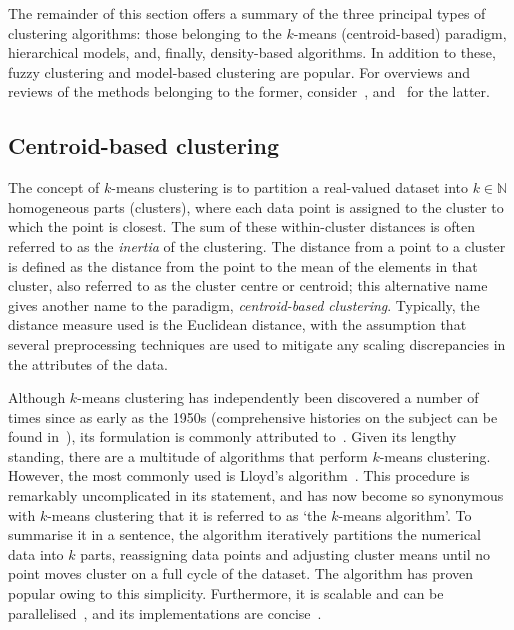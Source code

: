 The remainder of this section offers a summary of the three principal types of
clustering algorithms: those belonging to the \(k\)-means (centroid-based)
paradigm, hierarchical models, and, finally, density-based algorithms. In
addition to these, fuzzy clustering and model-based clustering are popular. For
overviews and reviews of the methods belonging to the former,
consider~\cite{Ferraro2019,Gosain2016,Li2016},
and~\cite{Bouveyron2019,Fruhwirth2019,McNicholas2016} for the latter.

\subsection{Centroid-based clustering}\label{subsec:kmeans}

The concept of \(k\)-means clustering is to partition a
real-valued dataset into \(k \in \mathbb N\) homogeneous parts (clusters), where
each data point is assigned to the cluster to which the point is closest. The
sum of these within-cluster distances is often referred to as the \emph{inertia}
of the clustering. The distance from a point to a cluster is defined as the
distance from the point to the mean of the elements in that cluster, also
referred to as the cluster centre or centroid; this alternative name gives
another name to the paradigm, \emph{centroid-based clustering}. Typically, the
distance measure used is the Euclidean distance, with the assumption that
several preprocessing techniques are used to mitigate any scaling discrepancies
in the attributes of the data.

Although \(k\)-means clustering has independently been discovered a number of
times since as early as the 1950s (comprehensive histories on the subject can be
found in~\cite{Bock2007,Jain2010}), its formulation is commonly attributed
to~\cite{Hartigan1979}. Given its lengthy standing, there are a multitude of
algorithms that perform \(k\)-means clustering. However, the most commonly used
is Lloyd's algorithm~\cite{Lloyd1982}. This procedure is remarkably
uncomplicated in its statement, and has now become so synonymous with
\(k\)-means clustering that it is referred to as `the \(k\)-means algorithm'. To
summarise it in a sentence, the algorithm iteratively partitions the numerical
data into \(k\) parts, reassigning data points and adjusting cluster means until
no point moves cluster on a full cycle of the dataset. The algorithm has proven
popular owing to this simplicity. Furthermore, it is scalable and can be
parallelised~\cite{Bahmani2012}, and its implementations are
concise~\cite{Olafsson2008,Wu2009}.

